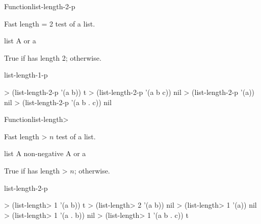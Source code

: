 \documentclass[10pt,twoside,english,pdftex]{article}
\begin{document}

\begin{functiondoc}{Function}{list-length-2-p}%
  { \returns{} }
%
%

\fnsyntax

\fnpurpose Fast length = 2 test of a list.

\fnpackage {}

\fnmodule {}

\fnargs
\begin{args}{list}
\arg[list] A  or a 
\end{args}

\fnreturns True if  has length 2; \nil{} otherwise.

\begin{alsos}{list-length-1-p}
\end{alsos}

\fnexamples
\begin{example}
> (list-length-2-p '(a b))
t
> (list-length-2-p '(a b c))
nil
> (list-length-2-p '(a))
nil
> (list-length-2-p '(a b . c))
nil
\end{example}

\end{functiondoc}


\begin{functiondoc}{Function}{list-length>}%
  { \returns{} }
%
%

\fnsyntax

\fnpurpose Fast length > $n$ test of a list.

\fnpackage {}

\fnmodule {}

\fnargs
\begin{args}{list}
\arg[n] A non-negative 
\arg[list] A  or a 
\end{args}

\fnreturns True if  has length > $n$; \nil{} otherwise.

\begin{alsos}{list-length-2-p}
\end{alsos}

\fnexamples
\begin{example}
> (list-length> 1 '(a b))
t
> (list-length> 2 '(a b))
nil
> (list-length> 1 '(a))
nil
> (list-length> 1 '(a . b))
nil
> (list-length> 1 '(a b . c))
t
\end{example}

\end{functiondoc}
\end{document}
